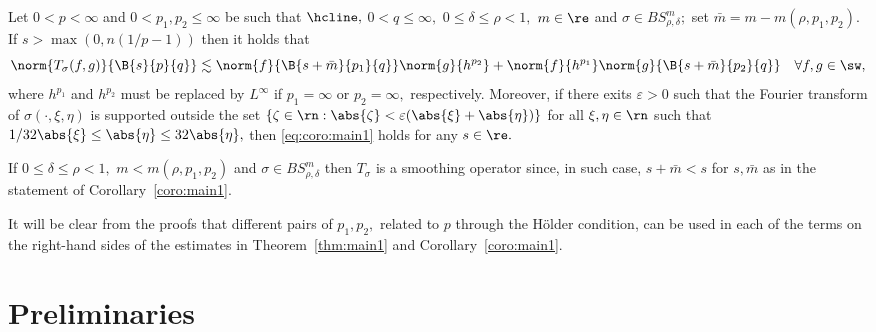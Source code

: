 \begin{corollary}\label{coro:main1} 
Let $0<p<\infty$ and $0<p_1,p_2\le \infty$ be such that $\hcline,$ $0<q\le \infty,$  $0\le\delta \le \rho<1,$   $m\in \re$ and $\sigma\in BS^{m}_{\rho,\delta};$ set $\bar{m}=m-m(\rho,p_1,p_2).$  If  $s>\max(0,n({1}/{p}-1))$ then it holds that
\begin{equation}\label{eq:coro:main1}
\norm{T_\sigma(f,g)}{\B{s}{p}{q}}\lesssim \norm{f}{\B{s+\bar{m}}{p_1}{q}}\norm{g}{h^{p_2}} +\norm{f}{h^{p_1}}\norm{g}{\B{s+\bar{m}}{p_2}{q}}\quad \forall f,g\in \sw,
\end{equation}
where $h^{p_1}$ and $h^{p_2}$ must be replaced by $L^\infty$ if $p_1=\infty$ or $p_2=\infty,$ respectively. Moreover,  if there exits $\varepsilon>0$ such that the Fourier transform of  $\sigma(\cdot,\xi,\eta)$ is  supported outside the set  $\{\zeta\in\rn:\abs{\zeta}<\varepsilon (\abs{\xi}+\abs{\eta})\}$ for all  $\xi,\eta\in\rn$ such that $1/32\abs{\xi}\le \abs{\eta}\le 32 \abs{\eta},$ then \eqref{eq:coro:main1} holds for any $s\in\re.$
\end{corollary}

\begin{remark} If $0\le \delta\le \rho<1,$ $m<m(\rho,p_1,p_2)$ and $\sigma\in BS^m_{\rho,\delta}$ then $T_\sigma$ is a smoothing operator since, in such case, $s+\bar{m}<s$ for $s,\bar{m}$ as in the statement of Corollary~\ref{coro:main1}. 
\end{remark}

\begin{remark} It will be clear from the proofs that different pairs of $p_1,p_2,$ related to $p$ through the H\"older condition, can be used in each of the terms on the right-hand sides of the estimates in Theorem~\ref{thm:main1} and Corollary~\ref{coro:main1}. 
\end{remark}

\section{Preliminaries}

